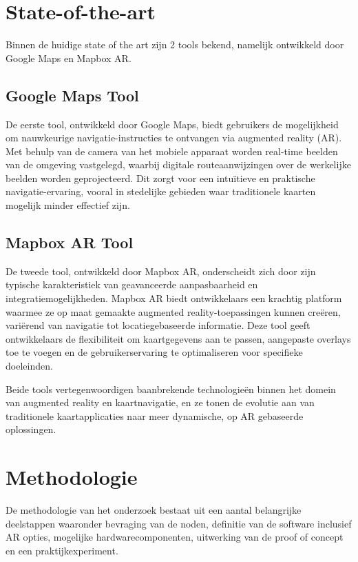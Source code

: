 \documentclass{hogent-article}
\begin{document}
    \section{State-of-the-art}%
    \label{sec:State-of-the-art}
    
    Binnen de huidige state of the art zijn 2 tools bekend, namelijk ontwikkeld door Google Maps en Mapbox AR.
    
    \subsection{Google Maps Tool}
    De eerste tool, ontwikkeld door Google Maps, biedt gebruikers de mogelijkheid om nauwkeurige navigatie-instructies te ontvangen via augmented reality (AR). Met behulp van de camera van het mobiele apparaat worden real-time beelden van de omgeving vastgelegd, waarbij digitale routeaanwijzingen over de werkelijke beelden worden geprojecteerd. Dit zorgt voor een intuïtieve en praktische navigatie-ervaring, vooral in stedelijke gebieden waar traditionele kaarten mogelijk minder effectief zijn.
    
    \subsection{Mapbox AR Tool}
    De tweede tool, ontwikkeld door Mapbox AR, onderscheidt zich door zijn typische karakteristiek van geavanceerde aanpasbaarheid en integratiemogelijkheden. Mapbox AR biedt ontwikkelaars een krachtig platform waarmee ze op maat gemaakte augmented reality-toepassingen kunnen creëren, variërend van navigatie tot locatiegebaseerde informatie. Deze tool geeft ontwikkelaars de flexibiliteit om kaartgegevens aan te passen, aangepaste overlays toe te voegen en de gebruikerservaring te optimaliseren voor specifieke doeleinden.
    
    Beide tools vertegenwoordigen baanbrekende technologieën binnen het domein van augmented reality en kaartnavigatie, en ze tonen de evolutie aan van traditionele kaartapplicaties naar meer dynamische, op AR gebaseerde oplossingen.
    

    
    \section{Methodologie}%
   
    De methodologie van het onderzoek bestaat uit een aantal belangrijke deelstappen waaronder bevraging van de noden, definitie van de software inclusief AR opties, mogelijke hardwarecomponenten, uitwerking van de proof of concept en een praktijkexperiment.
    
\end{document}
